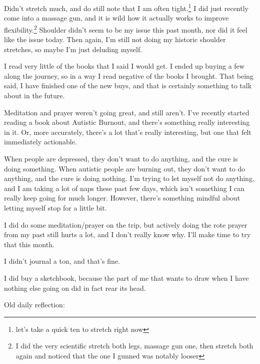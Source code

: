 \documentclass[12pt]{article}
\renewcommand{\,}{\textsuperscript{,}}
\begin{document}
Didn't stretch much, and do still note that I am often tight.\footnote{let's take a quick ten to stretch right now}  
I did just recently come into a massage gun, and it is wild how it actually works to improve flexibility.\footnote{I did the very scientific stretch both legs, massage gun one, then stretch both again and noticed that the one I gunned was notably looser}  
Shoulder didn't seem to be my issue this past month, nor did it feel like the issue today.  
Then again, I'm still not doing my historic shoulder stretches, so maybe I'm just deluding myself.

I read very little of the books that I said I would get.  
I ended up buying a few along the journey, so in a way I read negative of the books I brought.  
That being said, I have finished one of the new buys, and that is certainly something to talk about in the future.

Meditation and prayer weren't going great, and still aren't.  
I've recently started reading a book about Autistic Burnout, and there's something really interesting in it.  
Or, more accurately, there's a lot that's really interesting, but one that felt immediately actionable.

When people are depressed, they don't want to do anything, and the cure is doing something.  
When autistic people are burning out, they don't want to do anything, and the cure is doing nothing.  
I'm trying to let myself not do anything, and I am taking a lot of naps these past few days, which isn't something I can really keep going for much longer.  
However, there's something mindful about letting myself stop for a little bit.

I did do some meditation/prayer on the trip, but actively doing the rote prayer from my past still hurts a lot, and I don't really know why.  
I'll make time to try that this month.

I didn't journal a ton, and that's fine.

I did buy a sketchbook, because the part of me that wants to draw when I have nothing else going on did in fact rear its head.

Old daily reflection:
\end{document}
